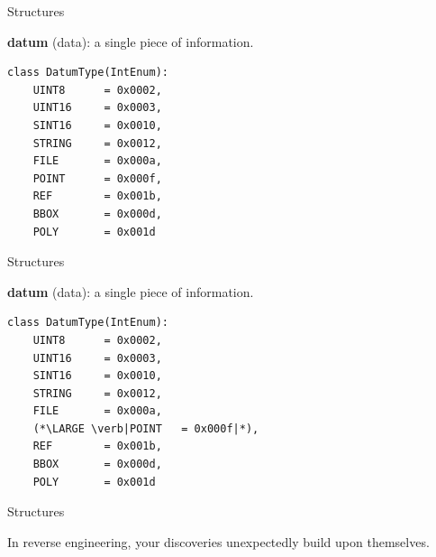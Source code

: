 \documentclass[xcolor={dvipsnames,table},aspectratio=169]{beamer}
\begin{document}
\begin{frame}[fragile]{Structures}\pause
  \begin{center}
    \Large \textbf{datum}\pause{} (data):\pause{} a single piece of information.\pause
  \end{center}
\begin{lstlisting}
class DatumType(IntEnum):
    UINT8      = 0x0002,
    UINT16     = 0x0003,
    SINT16     = 0x0010,
    STRING     = 0x0012,
    FILE       = 0x000a,
    POINT      = 0x000f,
    REF        = 0x001b,
    BBOX       = 0x000d,
    POLY       = 0x001d
\end{lstlisting}
\end{frame}

\begin{frame}[fragile]{Structures}
  \begin{center}
    \Large \textbf{datum} (data): a single piece of information.
  \end{center}
\begin{lstlisting}
class DatumType(IntEnum):
    UINT8      = 0x0002,
    UINT16     = 0x0003,
    SINT16     = 0x0010,
    STRING     = 0x0012,
    FILE       = 0x000a,
    (*\LARGE \verb|POINT   = 0x000f|*),
    REF        = 0x001b,
    BBOX       = 0x000d,
    POLY       = 0x001d
\end{lstlisting}
\end{frame}

\begin{frame}[label=proverb]{Structures}
  \begin{center}
    \LARGE In reverse engineering, your discoveries unexpectedly build upon themselves.
  \end{center}
\end{frame}
\end{document}
